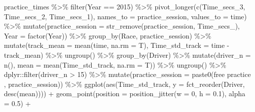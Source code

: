 \documentclass[
]{book}
\newenvironment{Shaded}{\begin{snugshade}}{\end{snugshade}}
\newcommand{\AttributeTok}[1]{\textcolor[rgb]{0.77,0.63,0.00}{#1}}
\newcommand{\DecValTok}[1]{\textcolor[rgb]{0.00,0.00,0.81}{#1}}
\newcommand{\FloatTok}[1]{\textcolor[rgb]{0.00,0.00,0.81}{#1}}
\newcommand{\FunctionTok}[1]{\textcolor[rgb]{0.00,0.00,0.00}{#1}}
\newcommand{\NormalTok}[1]{#1}
\newcommand{\SpecialCharTok}[1]{\textcolor[rgb]{0.00,0.00,0.00}{#1}}
\newcommand{\StringTok}[1]{\textcolor[rgb]{0.31,0.60,0.02}{#1}}
\begin{document}
\begin{Shaded}
\begin{Highlighting}[]
\NormalTok{practice\_times }\SpecialCharTok{\%\textgreater{}\%}
  \FunctionTok{filter}\NormalTok{(Year }\SpecialCharTok{==} \DecValTok{2015}\NormalTok{) }\SpecialCharTok{\%\textgreater{}\%} 
  \FunctionTok{pivot\_longer}\NormalTok{(}\FunctionTok{c}\NormalTok{(Time\_secs\_3, Time\_secs\_2, Time\_secs\_1), }\AttributeTok{names\_to =} \StringTok{\textquotesingle{}practice\_session\textquotesingle{}}\NormalTok{, }\AttributeTok{values\_to =} \StringTok{\textquotesingle{}time\textquotesingle{}}\NormalTok{) }\SpecialCharTok{\%\textgreater{}\%}
  \FunctionTok{mutate}\NormalTok{(}\AttributeTok{practice\_session =} \FunctionTok{str\_remove}\NormalTok{(practice\_session, }\StringTok{\textquotesingle{}Time\_secs\_\textquotesingle{}}\NormalTok{),}
         \AttributeTok{Year =} \FunctionTok{factor}\NormalTok{(Year)) }\SpecialCharTok{\%\textgreater{}\%}
   \FunctionTok{group\_by}\NormalTok{(Race, practice\_session) }\SpecialCharTok{\%\textgreater{}\%}
   \FunctionTok{mutate}\NormalTok{(}\AttributeTok{track\_mean =} \FunctionTok{mean}\NormalTok{(time, }\AttributeTok{na.rm =}\NormalTok{ T),}
          \AttributeTok{Time\_std\_track =}\NormalTok{ time }\SpecialCharTok{{-}}\NormalTok{ track\_mean) }\SpecialCharTok{\%\textgreater{}\%} 
   \FunctionTok{ungroup}\NormalTok{() }\SpecialCharTok{\%\textgreater{}\%} 
   \FunctionTok{group\_by}\NormalTok{(Driver) }\SpecialCharTok{\%\textgreater{}\%} 
   \FunctionTok{mutate}\NormalTok{(}\AttributeTok{driver\_n =} \FunctionTok{n}\NormalTok{(),}
          \AttributeTok{mean =} \FunctionTok{mean}\NormalTok{(Time\_std\_track, }\AttributeTok{na.rm =}\NormalTok{ T)) }\SpecialCharTok{\%\textgreater{}\%}
   \FunctionTok{ungroup}\NormalTok{() }\SpecialCharTok{\%\textgreater{}\%}
\NormalTok{   dplyr}\SpecialCharTok{::}\FunctionTok{filter}\NormalTok{(driver\_n }\SpecialCharTok{\textgreater{}} \DecValTok{15}\NormalTok{) }\SpecialCharTok{\%\textgreater{}\%} 
  \FunctionTok{mutate}\NormalTok{(}\AttributeTok{practice\_session =} \FunctionTok{paste0}\NormalTok{(}\StringTok{\textquotesingle{}free practice \textquotesingle{}}\NormalTok{, practice\_session)) }\SpecialCharTok{\%\textgreater{}\%}  
   \FunctionTok{ggplot}\NormalTok{(}\FunctionTok{aes}\NormalTok{(Time\_std\_track, }\AttributeTok{y =} \FunctionTok{fct\_reorder}\NormalTok{(Driver, }\FunctionTok{desc}\NormalTok{(mean)))) }\SpecialCharTok{+}
   \FunctionTok{geom\_point}\NormalTok{(}\AttributeTok{position =} \FunctionTok{position\_jitter}\NormalTok{(}\AttributeTok{w =} \DecValTok{0}\NormalTok{, }\AttributeTok{h =} \FloatTok{0.1}\NormalTok{), }\AttributeTok{alpha =} \FloatTok{0.5}\NormalTok{) }\SpecialCharTok{+}

\end{Highlighting}
\end{Shaded}
\end{document}
